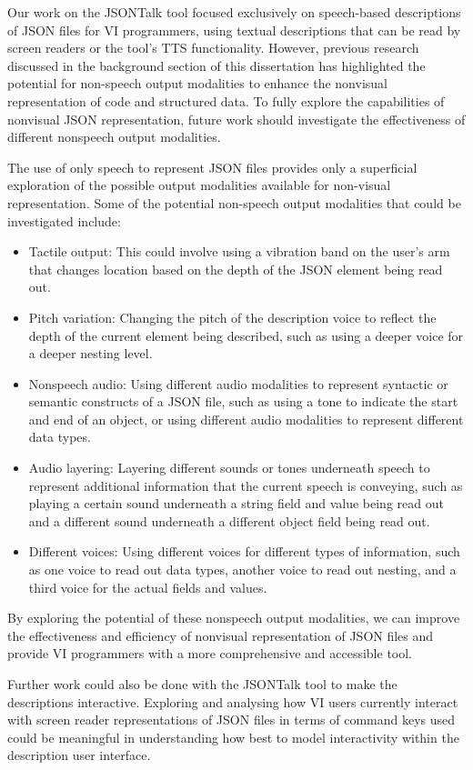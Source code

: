 \documentclass{l4proj}
\begin{document}
Our work on the JSONTalk tool focused exclusively on speech-based descriptions of JSON files for VI programmers, using textual descriptions that can be read by screen readers or the tool's TTS functionality. However, previous research discussed in the background section of this dissertation has highlighted the potential for non-speech output modalities to enhance the nonvisual representation of code and structured data. To fully explore the capabilities of nonvisual JSON representation, future work should investigate the effectiveness of different nonspeech output modalities.

The use of only speech to represent JSON files provides only a superficial exploration of the possible output modalities available for non-visual representation. Some of the potential non-speech output modalities that could be investigated include:
\begin{itemize}
    \item Tactile output: This could involve using a vibration band on the user's arm that changes location based on the depth of the JSON element being read out.
    \item Pitch variation: Changing the pitch of the description voice to reflect the depth of the current element being described, such as using a deeper voice for a deeper nesting level.
    \item Nonspeech audio: Using different audio modalities to represent syntactic or semantic constructs of a JSON file, such as using a tone to indicate the start and end of an object, or using different audio modalities to represent different data types.
    \item Audio layering: Layering different sounds or tones underneath speech to represent additional information that the current speech is conveying, such as playing a certain sound underneath a string field and value being read out and a different sound underneath a different object field being read out.
    \item Different voices: Using different voices for different types of information, such as one voice to read out data types, another voice to read out nesting, and a third voice for the actual fields and values.
\end{itemize}
By exploring the potential of these nonspeech output modalities, we can improve the effectiveness and efficiency of nonvisual representation of JSON files and provide VI programmers with a more comprehensive and accessible tool.

Further work could also be done with the JSONTalk tool to make the descriptions interactive. Exploring and analysing how VI users currently interact with screen reader representations of JSON files in terms of command keys used could be meaningful in understanding how best to model interactivity within the description user interface.
\end{document}
